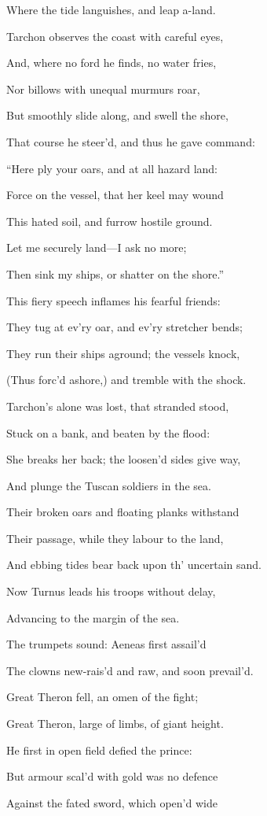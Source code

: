 Where the tide languishes, and leap a-land.

Tarchon observes the coast with careful eyes,

And, where no ford he finds, no water fries,

Nor billows with unequal murmurs roar,

But smoothly slide along, and swell the shore,

That course he steer’d, and thus he gave command:

“Here ply your oars, and at all hazard land:

Force on the vessel, that her keel may wound

This hated soil, and furrow hostile ground.

Let me securely land—I ask no more;

Then sink my ships, or shatter on the shore.”

This fiery speech inflames his fearful friends:

They tug at ev’ry oar, and ev’ry stretcher bends;

They run their ships aground; the vessels knock,

(Thus forc’d ashore,) and tremble with the shock.

Tarchon’s alone was lost, that stranded stood,

Stuck on a bank, and beaten by the flood:

She breaks her back; the loosen’d sides give way,

And plunge the Tuscan soldiers in the sea.

Their broken oars and floating planks withstand

Their passage, while they labour to the land,

And ebbing tides bear back upon th’ uncertain sand.

Now Turnus leads his troops without delay,

Advancing to the margin of the sea.

The trumpets sound: Aeneas first assail’d

The clowns new-rais’d and raw, and soon prevail’d.

Great Theron fell, an omen of the fight;

Great Theron, large of limbs, of giant height.

He first in open field defied the prince:

But armour scal’d with gold was no defence

Against the fated sword, which open’d wide

